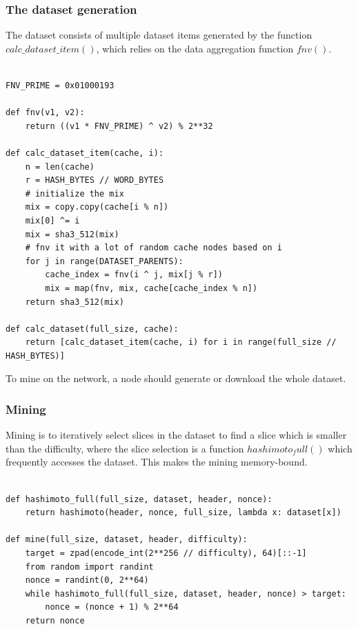 \documentclass[11pt]{article}
\begin{document}
\subsubsection{The dataset generation}

The dataset consists of multiple dataset items generated by the function $calc\_dataset\_item()$, which relies on the data aggregation function $fnv()$.

\begin{lstlisting}

FNV_PRIME = 0x01000193

def fnv(v1, v2):
    return ((v1 * FNV_PRIME) ^ v2) % 2**32
    
def calc_dataset_item(cache, i):
    n = len(cache)
    r = HASH_BYTES // WORD_BYTES
    # initialize the mix
    mix = copy.copy(cache[i % n])
    mix[0] ^= i
    mix = sha3_512(mix)
    # fnv it with a lot of random cache nodes based on i
    for j in range(DATASET_PARENTS):
        cache_index = fnv(i ^ j, mix[j % r])
        mix = map(fnv, mix, cache[cache_index % n])
    return sha3_512(mix)

def calc_dataset(full_size, cache):
    return [calc_dataset_item(cache, i) for i in range(full_size // HASH_BYTES)]

\end{lstlisting}

To mine on the network, a node should generate or download the whole dataset.

\subsubsection{Mining}

Mining is to iteratively select slices in the dataset to find a slice which is smaller than the difficulty, where the slice selection is a function $hashimoto_full()$ which frequently accesses the dataset. This makes the mining memory-bound.

\begin{lstlisting}

def hashimoto_full(full_size, dataset, header, nonce):
    return hashimoto(header, nonce, full_size, lambda x: dataset[x])

def mine(full_size, dataset, header, difficulty):
    target = zpad(encode_int(2**256 // difficulty), 64)[::-1]
    from random import randint
    nonce = randint(0, 2**64)
    while hashimoto_full(full_size, dataset, header, nonce) > target:
        nonce = (nonce + 1) % 2**64
    return nonce
\end{lstlisting}
\end{document}
